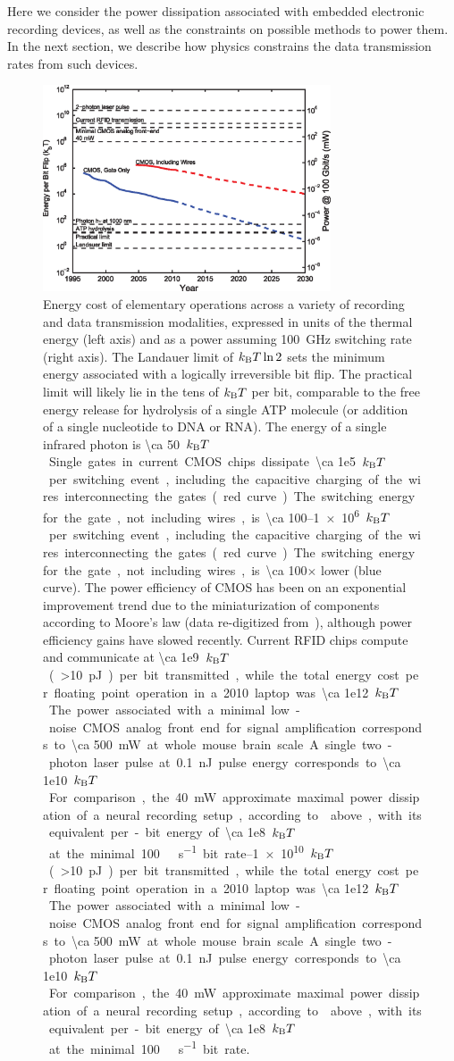 Here we consider the power dissipation associated with embedded electronic recording devices, as well as the constraints on possible methods to power them.
In the next section, we describe how physics constrains the data transmission rates from such devices.

\begin{figure}[htbp]
\caption{
Energy cost of elementary operations across a variety of recording and data transmission modalities, expressed in units of the thermal energy (left axis) and as a power assuming \SI{100}{\giga\hertz} switching rate (right axis). The Landauer limit of $k_{\text{\scriptsize B}} T \ln 2$ sets the minimum energy associated with a logically irreversible bit flip. The practical limit will likely lie in the tens of $k_{\text{\scriptsize B}} T$ per bit, comparable to the free energy release for hydrolysis of a single ATP molecule (or addition of a single nucleotide to DNA or RNA). The energy of a single infrared photon is \SI{\ca 50}{$k_{\text{\scriptsize B}} T$}. Single gates in current CMOS chips dissipate \SIrange{\ca 1e5}{1e6}{$k_{\text{\scriptsize B}} T$} per switching event, including the capacitive charging of the wires interconnecting the gates (red curve). The switching energy for the gate, not including wires, is \num{\ca 100}$\times$ lower (blue curve). The power efficiency of CMOS has been on an exponential improvement trend due to the miniaturization of components according to Moore's law (data re-digitized from~\cite{tucker11}), although power efficiency gains have slowed recently. Current RFID chips compute and communicate at \SIrange{\ca 1e9}{1e10}{$k_{\text{\scriptsize B}} T$} (\SI{>10}{\pico\joule}) per bit transmitted, while the total energy cost per floating point operation in a 2010 laptop was \SI{\ca 1e12}{$k_{\text{\scriptsize B}} T$}. The power associated with a minimal low-noise CMOS analog front end for signal amplification corresponds to \SI{\ca 500}{\milli\watt} at whole mouse brain scale. A single two-photon laser pulse at \SI{0.1}{\nano\joule} pulse energy corresponds to \SI{\ca 1e10}{$k_{\text{\scriptsize B}} T$}. For comparison, the \SI{40}{\milli\watt} approximate maximal power dissipation of a neural recording setup, according to  above, with its equivalent per-bit energy of \SI{\ca 1e8}{$k_{\text{\scriptsize B}} T$} at the minimal \SI{100}{\giga\bit\per\second} bit rate.
}
\label{fig:cmos}
\centering
\includegraphics[width=0.76\textwidth]{figs/Fig4.eps}
\end{figure}

